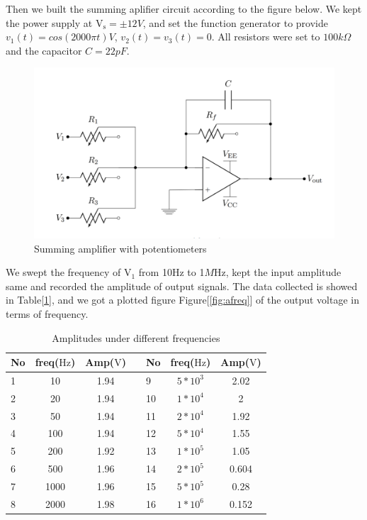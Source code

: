 \hfill \newline
\phantom{ } Then we built the summing aplifier circuit according to the figure below. We kept the power supply at $ \mathrm{V_s} = \pm12\si{V} $, and set the function generator to provide ${v_1}(t)=cos(2000\pi t)\si{V}$, ${v_2}(t)={v_3}(t)=0$. All resistors were set to $100\si{k\Omega}$ and the capacitor $C=22\si{pF}$.
\begin{figure}[!htbp]
	\centering 
	\begin{framed}
		\includegraphics[width=\linewidth]{images/summing_amp.PNG} 
		\caption{Summing amplifier with potentiometers}
		\label{fig:samp} 
	\end{framed}
\end{figure} 

\phantom{ } We swept the frequency of $\mathrm{V_1}$ from 10$\si{\hertz}$ to 1$\si{M\hertz}$, kept the input amplitude same and recorded the amplitude of output signals. The data collected is showed in Table[\ref{tab:caf}], and we got a plotted figure Figure[\ref{fig:afreq}] of the output voltage in terms of frequency.

\begin{table}[!htbp]
	\centering
	\caption{Amplitudes under different frequencies}
	\begin{tabular}{lccllcc}
		\toprule
		No&freq($\si{\hertz}$)&Amp($\si{\volt}$)&&No&freq($\si{\hertz}$)  &Amp($\si{\volt}$)\\
		\midrule
		1	&10		&1.94	&&9 &$5*10^3$&2.02\\
		2	&20		&1.94	&&10&$1*10^4$&2\\
		3	&50		&1.94	&&11&$2*10^4$&1.92\\
		4	&100	&1.94	&&12&$5*10^4$&1.55\\
		5	&200	&1.92	&&13&$1*10^5$&1.05\\
		6	&500	&1.96	&&14&$2*10^5$&0.604\\
		7	&1000	&1.96	&&15&$5*10^5$&0.28\\
		8	&2000	&1.98	&&16&$1*10^6$&0.152\\
		\bottomrule
	\end{tabular}
	\label{tab:caf}
\end{table}

